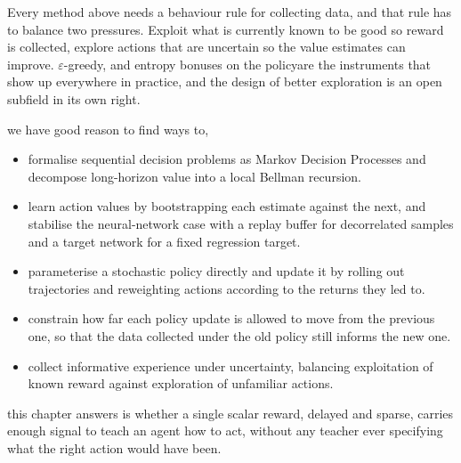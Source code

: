 Every method above needs a behaviour rule for collecting data,
and that rule has to balance two pressures.
Exploit what is currently known to be good so reward is collected,
explore actions that are uncertain so the value estimates can improve.
$\varepsilon$-greedy, and entropy bonuses on the policyare the instruments that show up everywhere in practice,
and the design of better exploration is an open subfield in its own right.



 we have good reason to find ways to,
\begin{itemize}
    \item formalise sequential decision problems as Markov Decision Processes
    and decompose long-horizon value into a local Bellman recursion.
    \item learn action values by bootstrapping each estimate against the next,
    and stabilise the neural-network case with a replay buffer for decorrelated samples and a target network for a fixed regression target.
    \item parameterise a stochastic policy directly and update it by rolling out trajectories
    and reweighting actions according to the returns they led to.
    \item constrain how far each policy update is allowed to move from the previous one,
    so that the data collected under the old policy still informs the new one.
    \item collect informative experience under uncertainty,
    balancing exploitation of known reward against exploration of unfamiliar actions.
\end{itemize}

 this chapter answers is whether a single scalar reward,
delayed and sparse, carries enough signal to teach an agent how to act,
without any teacher ever specifying what the right action would have been.

\newpage


